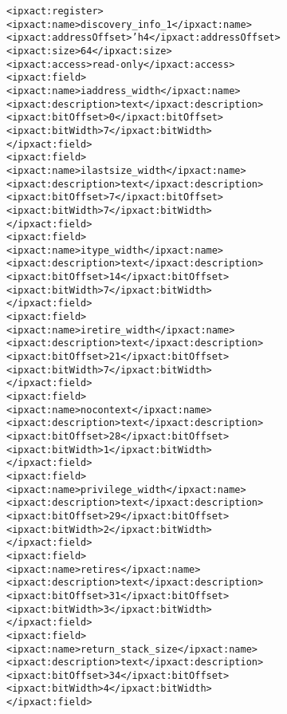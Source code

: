 \begin{alltt}
            <ipxact:register>
               <ipxact:name>discovery_info_1</ipxact:name>
               <ipxact:addressOffset>'h4</ipxact:addressOffset>
               <ipxact:size>64</ipxact:size>
               <ipxact:access>read-only</ipxact:access>
               <ipxact:field>
                  <ipxact:name>iaddress_width</ipxact:name>
                  <ipxact:description>text</ipxact:description>
                  <ipxact:bitOffset>0</ipxact:bitOffset>
                  <ipxact:bitWidth>7</ipxact:bitWidth>
               </ipxact:field>
               <ipxact:field>
                  <ipxact:name>ilastsize_width</ipxact:name>
                  <ipxact:description>text</ipxact:description>
                  <ipxact:bitOffset>7</ipxact:bitOffset>
                  <ipxact:bitWidth>7</ipxact:bitWidth>
               </ipxact:field>
               <ipxact:field>
                  <ipxact:name>itype_width</ipxact:name>
                  <ipxact:description>text</ipxact:description>
                  <ipxact:bitOffset>14</ipxact:bitOffset>
                  <ipxact:bitWidth>7</ipxact:bitWidth>
               </ipxact:field>
               <ipxact:field>
                  <ipxact:name>iretire_width</ipxact:name>
                  <ipxact:description>text</ipxact:description>
                  <ipxact:bitOffset>21</ipxact:bitOffset>
                  <ipxact:bitWidth>7</ipxact:bitWidth>
               </ipxact:field>
               <ipxact:field>
                  <ipxact:name>nocontext</ipxact:name>
                  <ipxact:description>text</ipxact:description>
                  <ipxact:bitOffset>28</ipxact:bitOffset>
                  <ipxact:bitWidth>1</ipxact:bitWidth>
               </ipxact:field>
               <ipxact:field>
                  <ipxact:name>privilege_width</ipxact:name>
                  <ipxact:description>text</ipxact:description>
                  <ipxact:bitOffset>29</ipxact:bitOffset>
                  <ipxact:bitWidth>2</ipxact:bitWidth>
               </ipxact:field>
               <ipxact:field>
                  <ipxact:name>retires</ipxact:name>
                  <ipxact:description>text</ipxact:description>
                  <ipxact:bitOffset>31</ipxact:bitOffset>
                  <ipxact:bitWidth>3</ipxact:bitWidth>
               </ipxact:field>
               <ipxact:field>
                  <ipxact:name>return_stack_size</ipxact:name>
                  <ipxact:description>text</ipxact:description>
                  <ipxact:bitOffset>34</ipxact:bitOffset>
                  <ipxact:bitWidth>4</ipxact:bitWidth>
               </ipxact:field>

\end{alltt}
